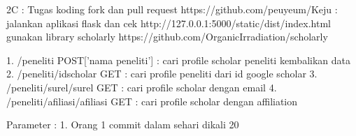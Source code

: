 2C :
Tugas koding fork dan pull request https://github.com/peuyeum/Keju :
jalankan aplikasi flask dan cek http://127.0.0.1:5000/static/dist/index.html
gunakan library scholarly https://github.com/OrganicIrradiation/scholarly

1. /peneliti POST['nama peneliti'] : cari profile scholar peneliti kembalikan data
2. /peneliti/{idscholar} GET : cari profile peneliti dari id google scholar
3. /peneliti/surel/{surel} GET : cari profile scholar dengan email
4. /peneliti/afiliasi/{afiliasi} GET : cari profile scholar dengan affiliation


Parameter :
1. Orang 1 commit dalam sehari dikali 20